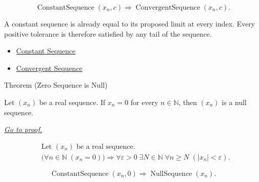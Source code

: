\begin{remark*}
\[
\operatorname{ConstantSequence}(x_n,c)
\Longrightarrow
\operatorname{ConvergentSequence}(x_n,c).
\]
\end{remark*}

\begin{remark*}[Interpretation]
A constant sequence is already equal to its proposed limit at every index.
Every positive tolerance is therefore satisfied by any tail of the sequence.
\end{remark*}

\begin{dependencies}
\begin{itemize}
  \item \hyperref[def:constant-sequence]{Constant Sequence}
  \item \hyperref[def:convergent-sequence]{Convergent Sequence}
\end{itemize}
\end{dependencies}


\begin{theorembox}{Theorem (Zero Sequence is Null)}
\begin{theorem}
\label{thm:zero-sequence-is-null}
Let $(x_n)$ be a real sequence. If $x_n = 0$ for every $n \in \mathbb{N}$,
then $(x_n)$ is a null sequence.

\smallskip
\noindent
\hyperref[prf:zero-sequence-is-null]{\textit{Go to proof.}}
\end{theorem}
\end{theorembox}

\begin{remark*}
\[
\begin{aligned}
&\text{Let } (x_n) \text{ be a real sequence.}\\
&\bigl(\forall n \in \mathbb{N}\;(x_n = 0)\bigr)
\Longrightarrow
\forall \varepsilon > 0\;
\exists N \in \mathbb{N}\;
\forall n \ge N\;(|x_n| < \varepsilon).
\end{aligned}
\]
\end{remark*}

\begin{remark*}
\[
\operatorname{ConstantSequence}(x_n,0)
\Longrightarrow
\operatorname{NullSequence}(x_n).
\]
\end{remark*}

